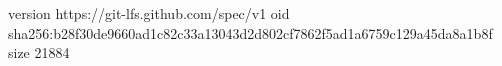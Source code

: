 version https://git-lfs.github.com/spec/v1
oid sha256:b28f30de9660ad1c82c33a13043d2d802cf7862f5ad1a6759c129a45da8a1b8f
size 21884
